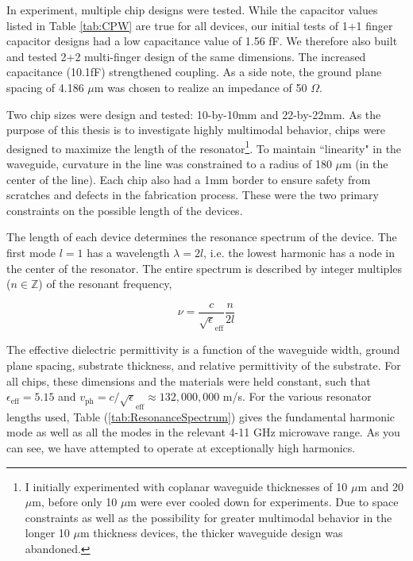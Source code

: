 \documentclass[11 pt, oneside]{book} %
\begin{document}
In experiment, multiple chip designs were tested. While the capacitor values listed in Table \ref{tab:CPW} are true for all devices, our initial tests of 1+1 finger capacitor designs had a low capacitance value of 1.56 fF. We therefore also built and tested 2+2 multi-finger design of the same dimensions. The increased capacitance (10.1fF) strengthened coupling. As a side note, the ground plane spacing of 4.186 $\mu$m was chosen to realize an impedance of 50 $\Omega$. 

Two chip sizes were design and tested: 10-by-10mm and 22-by-22mm. As the purpose of this thesis is to investigate highly multimodal behavior, chips were designed to maximize the length of the resonator\footnote{I initially experimented with coplanar waveguide thicknesses of 10 $\mu$m and 20 $\mu$m, before only 10 $\mu$m were ever cooled down for experiments. Due to space constraints as well as the possibility for greater multimodal behavior in the longer 10 $\mu$m thickness devices, the thicker waveguide design was abandoned.}. To maintain ``linearity" in the waveguide, curvature in the line was constrained to a radius of 180 $\mu$m (in the center of the line). Each chip also had a 1mm border to ensure safety from scratches and defects in the fabrication process. These were the two primary constraints on the possible length of the devices. 

The length of each device determines the resonance spectrum of the device. The first mode $l=1$ has a wavelength $\lambda=2l$, i.e. the lowest harmonic has a node in the center of the resonator. The entire spectrum is described by integer multiples ($n \in \mathbb{Z}$) of the resonant frequency, 

\begin{equation}
\nu=\frac{c}{\sqrt\epsilon_{\mathrm{eff}}}\frac{n}{2l}
\end{equation}

The effective dielectric permittivity is a function of the waveguide width, ground plane spacing, substrate thickness, and relative permittivity of the substrate. For all chips, these dimensions and the materials were held constant, such that $\epsilon_{\mathrm{eff}}=5.15$ and $v_{\mathrm{ph}}=c/\sqrt\epsilon_{\mathrm{eff}}\approx 132,000,000$ m/s. For the various resonator lengths used, Table (\ref{tab:ResonanceSpectrum}) gives the fundamental harmonic mode as well as all the modes in the relevant 4-11 GHz microwave range. As you can see, we have attempted to operate at exceptionally high harmonics. 
\end{document}
